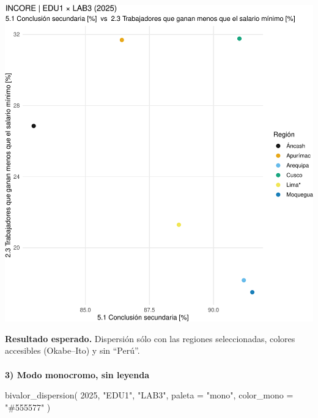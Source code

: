 \documentclass[
  11pt,
  letterpaper,
  DIV=11,
  numbers=noendperiod]{scrartcl}
\makeatletter
\let\oldparagraph\paragraph
\renewcommand{\paragraph}{
    \@ifstar
      \xxxParagraphStar
      \xxxParagraphNoStar
  }
\newcommand{\xxxParagraphStar}[1]{\oldparagraph*{#1}\mbox{}}
\newcommand{\xxxParagraphNoStar}[1]{\oldparagraph{#1}\mbox{}}
\newenvironment{Shaded}{\begin{snugshade}}{\end{snugshade}}
\newcommand{\AttributeTok}[1]{\textcolor[rgb]{0.40,0.45,0.13}{#1}}
\newcommand{\DecValTok}[1]{\textcolor[rgb]{0.68,0.00,0.00}{#1}}
\newcommand{\FunctionTok}[1]{\textcolor[rgb]{0.28,0.35,0.67}{#1}}
\newcommand{\NormalTok}[1]{\textcolor[rgb]{0.00,0.23,0.31}{#1}}
\newcommand{\StringTok}[1]{\textcolor[rgb]{0.13,0.47,0.30}{#1}}
\makeatother
\begin{document}
\includegraphics{Manual_files/figure-pdf/unnamed-chunk-110-1.pdf}

\textbf{Resultado esperado.} Dispersión sólo con las regiones
seleccionadas, colores accesibles (Okabe--Ito) y sin ``Perú''.

\paragraph{\texorpdfstring{\textbf{3) Modo monocromo, sin
leyenda}}{3) Modo monocromo, sin leyenda}}\label{modo-monocromo-sin-leyenda}

\begin{Shaded}
\begin{Highlighting}[]
\FunctionTok{bivalor\_dispersion}\NormalTok{(}
  \DecValTok{2025}\NormalTok{, }\StringTok{"EDU1"}\NormalTok{, }\StringTok{"LAB3"}\NormalTok{,}
  \AttributeTok{paleta     =} \StringTok{"mono"}\NormalTok{,}
  \AttributeTok{color\_mono =} \StringTok{"\#555577"}
\NormalTok{)}
\end{Highlighting}
\end{Shaded}
\end{document}
